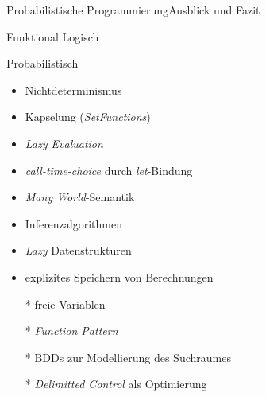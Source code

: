 \documentclass{beamer}
\begin{document}
\begin{frame}{Probabilistische Programmierung}{Ausblick und Fazit}
\begin{minipage}{.48\textwidth}
Funktional Logisch
\end{minipage}
%
\hfill
%
\begin{minipage}{.48\textwidth}
Probabilistisch
\end{minipage}
%
\vfill
%
\begin{minipage}{.48\textwidth}
\begin{itemize}
\item Nichtdeterminismus
\item Kapselung (\emph{SetFunctions})
\item \emph{Lazy Evaluation}
\item \emph{call-time-choice} durch \emph{let}-Bindung
\end{itemize}
\end{minipage}
% 
\hfill
%
\begin{minipage}{.48\textwidth}
\begin{itemize}
\item \emph{Many World}-Semantik
\item Inferenzalgorithmen
\item \emph{Lazy} Datenstrukturen
\item explizites Speichern von Berechnungen
\end{itemize}
\end{minipage}
%
\vfill
%
\begin{minipage}{.48\textwidth}
\begin{itemize}
\item [\color{green}*] freie Variablen
\item [\color{green}*] \emph{Function Pattern}
\end{itemize}
\end{minipage}
%
\hfill
%
\begin{minipage}{.48\textwidth}
\begin{itemize}
\item [\color{red}*] BDDs zur Modellierung des Suchraumes
\item [\color{red}*] \emph{Delimitted Control} als Optimierung
\end{itemize}
\end{minipage}

\end{frame}

\begin{frame}
\nocite{embeddedPP,purelyFunctionalLazy}




\end{frame}
\end{document}
